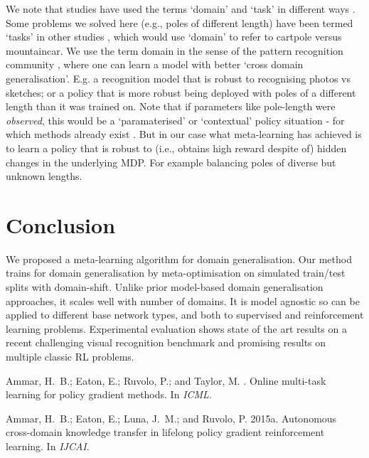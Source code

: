 \documentclass[letterpaper]{article} \usepackage{aaai18}  \usepackage{times}  \usepackage{helvet}  \usepackage{courier}  \usepackage{url}  \usepackage{graphicx}  \usepackage{amsmath}
\begin{document}
{We note that studies have used the terms `domain' and `task' in different ways \cite{ammar2015crossDomainTransfer,csurka2017domainAdaptationBook}. Some problems we solved here (e.g., poles of different length) have been termed `tasks' in other studies \cite{ammar2014pgella,ammar2015crossDomainTransfer}, which would use `domain' to refer to cartpole versus mountaincar. We use the term domain in the sense of the pattern recognition community \cite{csurka2017domainAdaptationBook}, where one can learn a model with better `cross domain generalisation'. E.g. a recognition model that is robust to recognising photos vs sketches; or a policy that is more robust being deployed with poles of a different length than it was trained on. Note that if parameters like pole-length were \emph{observed}, this would be a `paramaterised' or `contextual' policy situation - for which methods already exist \cite{kupcsik2013optionGeneralization}. But in our case what meta-learning has achieved is to learn a policy that is robust to (i.e., obtains high reward despite of) hidden changes in the underlying MDP. For example balancing poles of diverse but unknown lengths.

\section{Conclusion}

We proposed a meta-learning algorithm for domain generalisation. Our method trains for domain generalisation by meta-optimisation on simulated train/test splits with domain-shift. Unlike prior model-based domain generalisation approaches, it scales well with number of domains. It is model agnostic so can be applied to different base network types, and both to supervised and reinforcement learning problems. Experimental evaluation shows state of the art results on a recent challenging visual recognition benchmark and promising results on multiple classic RL problems. 

\clearpage
{
\begin{thebibliography}{}

Ammar, H.~B.; Eaton, E.; Ruvolo, P.; and Taylor, M.
.
\newblock Online multi-task learning for policy gradient methods.
\newblock In {\em ICML}.

Ammar, H.~B.; Eaton, E.; Luna, J.~M.; and Ruvolo, P.
\newblock 2015a.
\newblock Autonomous cross-domain knowledge transfer in lifelong policy
  gradient reinforcement learning.
\newblock In {\em IJCAI}.


\end{thebibliography}}}
\end{document}
